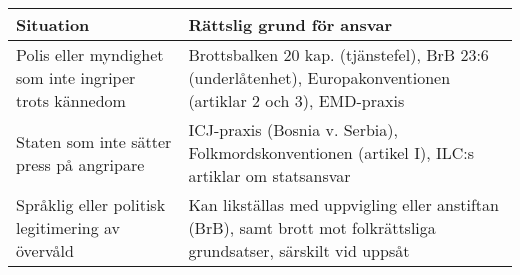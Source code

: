 \begin{tabular}{|p{5.5cm}|p{9cm}|}
\hline
\textbf{Situation} & \textbf{Rättslig grund för ansvar} \\
\hline
Polis eller myndighet som inte ingriper trots kännedom & Brottsbalken 20 kap. (tjänstefel), BrB 23:6 (underlåtenhet), Europakonventionen (artiklar 2 och 3), EMD-praxis \\
\hline
Staten som inte sätter press på angripare & ICJ-praxis (Bosnia v. Serbia), Folkmordskonventionen (artikel I), ILC:s artiklar om statsansvar \\
\hline
Språklig eller politisk legitimering av övervåld & Kan likställas med uppvigling eller anstiftan (BrB), samt brott mot folkrättsliga grundsatser, särskilt vid uppsåt \\
\hline
\end{tabular}
